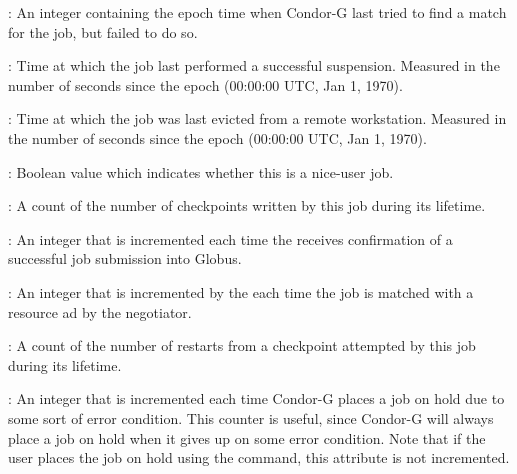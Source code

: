 \begin{description}
\item[\AdAttr{LastRejMatchTime}] :  An integer containing the epoch
time when Condor-G last tried to find a match for the job,
but failed to do so.

\item[\AdAttr{LastSuspensionTime}] : Time at which the job last performed a
successful suspension.  Measured in the number of seconds since the
epoch (00:00:00 UTC, Jan 1, 1970).

\item[\AdAttr{LastVacateTime}] : Time at which the job was last
evicted from a remote workstation.  Measured in the number of seconds
since the epoch (00:00:00 UTC, Jan 1, 1970).

\item[\AdAttr{NiceUser}] : Boolean value which indicates whether
this is a nice-user job.

\item[\AdAttr{NumCkpts}] : A count of the number of checkpoints
written by this job during its lifetime.

\item[\AdAttr{NumGlobusSubmits}] :  An integer that is incremented each
time the  receives confirmation of a successful job
submission into Globus.

\item[\AdAttr{NumJobMatches}] : An integer that is incremented by the
 each time the job is matched with a resource ad by the
negotiator.

\item[\AdAttr{NumRestarts}] : A count of the number of restarts from a
checkpoint attempted by this job during its lifetime.

\item[\AdAttr{NumSystemHolds}] :  An integer that is incremented each time
Condor-G places a job on hold due to some sort of error condition.  This
counter is useful, since Condor-G will always place a job on hold when it
gives up on some error condition.  Note that if the user places the job
on hold using the  command, this attribute is not incremented.


\end{description}
